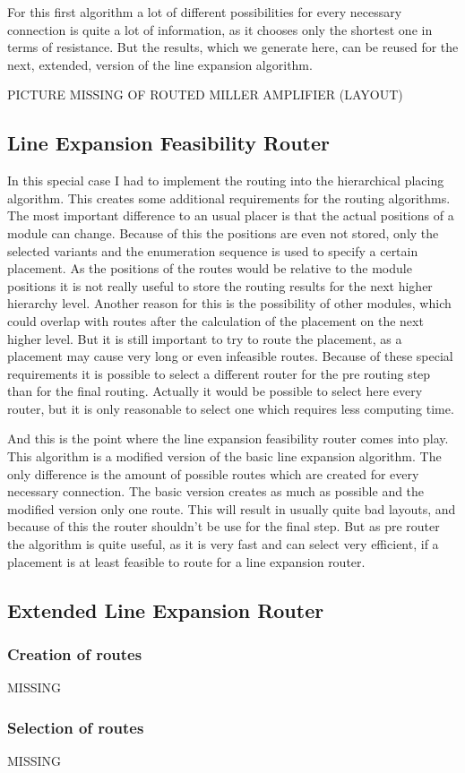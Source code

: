 For this first algorithm a lot of different possibilities for every necessary connection is quite a lot of information, as it chooses only the shortest one in terms of resistance. But the results, which we generate here, can be reused for the next, extended, version of the line expansion algorithm.

PICTURE MISSING OF ROUTED MILLER AMPLIFIER (LAYOUT)

\subsection{Line Expansion Feasibility Router}
In this special case I had to implement the routing into the hierarchical placing algorithm. This creates some additional requirements for the routing algorithms. The most important difference to an usual placer is that the actual positions of a module can change. Because of this the positions are even not stored, only the selected variants and the enumeration sequence is used to specify a certain placement. As the positions of the routes would be relative to the module positions it is not really useful to store the routing results for the next higher hierarchy level. Another reason for this is the possibility of other modules, which could overlap with routes after the calculation of the placement on the next higher level. But it is still important to try to route the placement, as a placement may cause very long or even infeasible routes. Because of these special requirements it is possible to select a different router for the pre routing step than for the final routing. Actually it would be possible to select here every router, but it is only reasonable to select one which requires less computing time.

And this is the point where the line expansion feasibility router comes into play. This algorithm is a modified version of the basic line expansion algorithm. The only difference  is the amount of possible routes which are created for every necessary connection. The basic version creates as much as possible and the modified version only one route. This will result in usually quite bad layouts, and because of this the router shouldn't be use for the final step. But as pre router the algorithm is quite useful, as it is very fast and can select very efficient, if a placement is at least feasible to route for a line expansion router.

\subsection{Extended Line Expansion Router}

\subsubsection{Creation of routes}
MISSING

\subsubsection{Selection of routes}
MISSING
